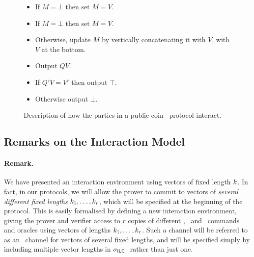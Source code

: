 \begin{figure}[!h]
{\begin{minipage}[t]{13cm}
\end{minipage}
\begin{minipage}[t]{6.5cm}
\vspace{0cm}
\begin{algorithm}[H]
\caption*{\ILCcommit($V$)}
\begin{itemize}
\item If $M = \bot$ then set $M = V$.
\item If $M = \bot$ then set $M = V$.
\item Otherwise, update $M$ by vertically concatenating it with $V$, with $V$ at the bottom.
\end{itemize}
\end{algorithm}
\begin{algorithm}[H]
\caption*{\ILCopen($Q$)}
\begin{itemize}
\item Output $QV$.
\end{itemize}
\end{algorithm}
\begin{algorithm}[H]
\caption*{\ILCcheck($Q', V'$)}
\begin{itemize}
\item If $Q'V = V'$ then output $\top$.
\item Otherwise output $\bot$.
\end{itemize}
\end{algorithm}
\end{minipage}
}
\caption{Description of how the parties in a public-coin \ILC\ protocol interact.}
\label{fig:ILCpseudocode2}
\end{figure}

\subsection{Remarks on the Interaction Model}

\paragraph{Remark.} We have presented an interaction environment using vectors of fixed length $k$. In fact, in our protocols, we will allow the prover to commit to vectors of \emph{several different fixed lengths} $k_1,\ldots,k_r$, which will be specified at the beginning of the protocol. This is easily formalised by defining a new interaction environment, giving the prover and verifier access to $r$ copies of different \ILCcommit, \ILCopen\ and \ILCcheck\ commands and oracles using vectors of lengths $k_1,\ldots,k_r$. Such a channel will be referred to as an \ILC\ channel for vectors of several fixed lengths, and will be specified simply by including multiple vector lengths in $\mathsf{\sigma}_{\mathsf{ILC}~}$ rather than just one.

